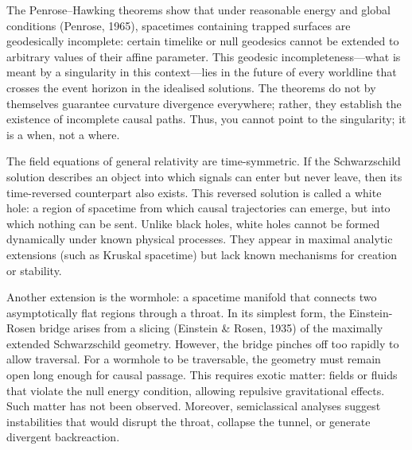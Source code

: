 The Penrose–Hawking theorems show that under reasonable energy and global conditions (Penrose, 1965), spacetimes containing trapped surfaces are geodesically incomplete: certain timelike or null geodesics cannot be extended to arbitrary values of their affine parameter. This geodesic incompleteness—what is meant by a \QSOpen{}singularity\QSClose{} in this context—lies in the future of every worldline that crosses the event horizon in the idealised solutions. The theorems do not by themselves guarantee curvature divergence everywhere; rather, they establish the existence of incomplete causal paths. Thus, you cannot point to the singularity; it is a when, not a where. 

The field equations of general relativity are time-symmetric. If the Schwarzschild solution describes an object into which signals can enter but never leave, then its time-reversed counterpart also exists. This reversed solution is called a white hole: a region of spacetime from which causal trajectories can emerge, but into which nothing can be sent. Unlike black holes, white holes cannot be formed dynamically under known physical processes. They appear in maximal analytic extensions (such as Kruskal spacetime) but lack known mechanisms for creation or stability. 

Another extension is the wormhole: a spacetime manifold that connects two asymptotically flat regions through a throat. In its simplest form, the Einstein-Rosen bridge arises from a slicing (Einstein \& Rosen, 1935) of the maximally extended Schwarzschild geometry. However, the bridge pinches off too rapidly to allow traversal. For a wormhole to be traversable, the geometry must remain open long enough for causal passage. This requires exotic matter: fields or fluids that violate the null energy condition, allowing repulsive gravitational effects. Such matter has not been observed. Moreover, semiclassical analyses suggest instabilities that would disrupt the throat, collapse the tunnel, or generate divergent backreaction.

